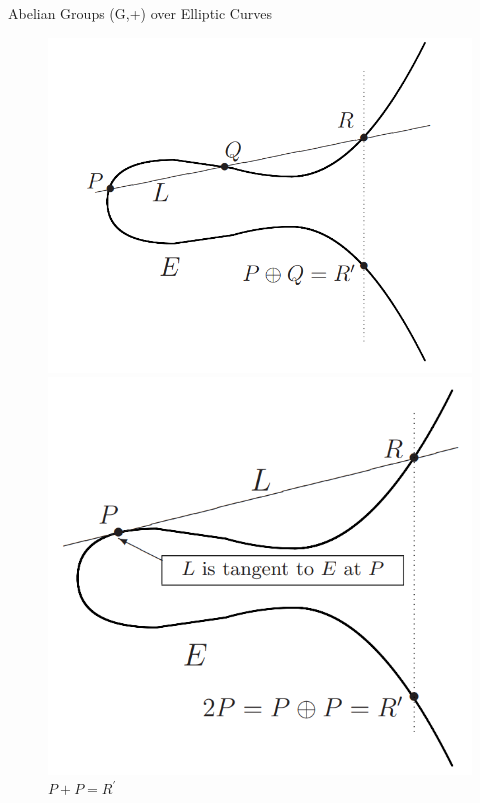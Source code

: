 \documentclass{beamer}
\begin{document}
\begin{frame}{Abelian Groups (G,+) over Elliptic Curves}
\begin{figure}
	\begin{minipage}{0.5\textwidth}
		\centering
		\includegraphics[width=1\linewidth]{P+Q}
		\caption{$P+Q=R^{\prime}$}\label{fig:p+q}
	\end{minipage}\hfill
	\begin{minipage}{0.48\textwidth}
		\centering
		\includegraphics[width=1\linewidth]{P+P}
		\caption{$P+P=R^{\prime}$}\label{fig:p+p}
	\end{minipage}
\end{figure}

\end{frame}
\end{document}
